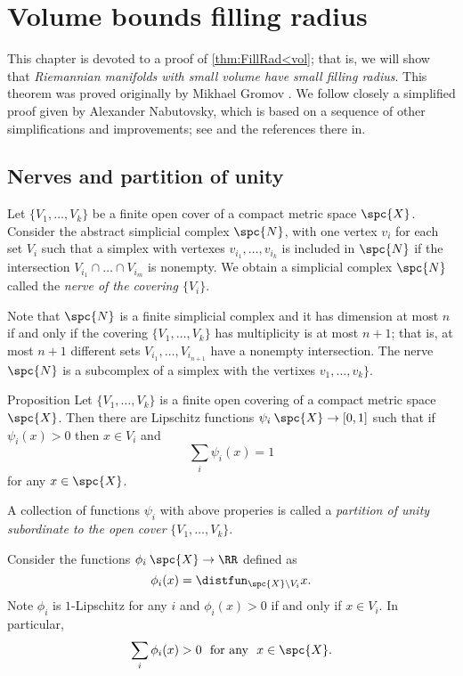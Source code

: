\chapter{Volume bounds filling radius}

This chapter 
is devoted to a proof of \ref{thm:FillRad<vol};
that is, we will show that \emph{Riemannian manifolds with small volume have small filling radius}.
This theorem was proved originally by Mikhael Gromov \cite{gromov-1983}.
We follow closely a simplified proof given by Alexander Nabutovsky, which is based on a sequence of other simplifications and improvements; see \cite{nabutovsky} and the references there in.

\section{Nerves and partition of unity}

Let $\{V_1,\dots,V_k\}$ be a finite open cover of a compact metric space $\spc{X}$.
Consider the abstract simplicial complex $\spc{N}$, with one vertex $v_i$ for each set $V_i$ such that a simplex with vertexes $v_{i_1},\dots, v_{i_k}$ is included in $\spc{N}$ if 
the intersection $V_{i_1}\cap\dots\cap V_{i_m}$ is nonempty.
We obtain a simplicial complex $\spc{N}$ called the \emph{nerve of the covering $\{V_i\}$}.

Note that $\spc{N}$ is a finite simplicial complex and it has dimension at most $n$ if and only if the covering $\{V_1,\dots,V_k\}$ has multiplicity is at most $n+1$;
that is, at most $n+1$ different sets $V_{i_1},\dots, V_{i_{n+1}}$ have a nonempty intersection.
The nerve $\spc{N}$ is a subcomplex of a simplex with the vertixes $v_1,\dots,v_k\}$.

\begin{thm}{Proposition}\label{thm:part-unit}
 Let $\{V_1,\dots,V_k\}$ is a finite open covering of a compact metric space ${\spc{X}}$.
Then there are Lipschitz functions $\psi_i\:{\spc{X}}\to[0,1]$ such that
if $\psi_i(x)>0$ then $x\in V_i$ and
$$\sum_i\psi_i(x)=1$$
for any $x\in {\spc{X}}$.
\end{thm}

A collection of functions $\psi_i$ with above properies is called 
a \emph{partition of unity subordinate to the open cover} $\{V_1,\dots,V_k\}$.

Consider the functions $\phi_i\:{\spc{X}}\to\RR$ defined as
$$\phi_i(x)=\distfun_{{\spc{X}}\backslash V_i} x.$$
Note $\phi_i$ is $1$-Lipschitz
for any $i$
and $\phi_i(x)>0$ if and only if $x\in V_i$.
In particular, 
$$\sum_i\phi_i(x)>0\ \ \text{for any}\ \ x\in {\spc{X}}.$$


